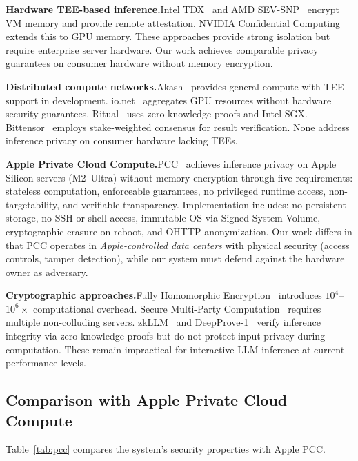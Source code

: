 \documentclass[10pt,twocolumn,letterpaper]{article}
\begin{document}
\textbf{Hardware TEE-based inference.}\quad Intel TDX~\cite{intel-tdx} and AMD SEV-SNP~\cite{amd-sev} encrypt VM memory and provide remote attestation. NVIDIA Confidential Computing~\cite{nvidia-cc} extends this to GPU memory. These approaches provide strong isolation but require enterprise server hardware. Our work achieves comparable privacy guarantees on consumer hardware without memory encryption.

\textbf{Distributed compute networks.}\quad Akash~\cite{akash} provides general compute with TEE support in development. io.net~\cite{ionet} aggregates GPU resources without hardware security guarantees. Ritual~\cite{ritual} uses zero-knowledge proofs and Intel SGX. Bittensor~\cite{bittensor} employs stake-weighted consensus for result verification. None address inference privacy on consumer hardware lacking TEEs.

\textbf{Apple Private Cloud Compute.}\quad PCC~\cite{apple-pcc} achieves inference privacy on Apple Silicon servers (M2~Ultra) without memory encryption through five requirements: stateless computation, enforceable guarantees, no privileged runtime access, non-targetability, and verifiable transparency. Implementation includes: no persistent storage, no SSH or shell access, immutable OS via Signed System Volume, cryptographic erasure on reboot, and OHTTP anonymization. Our work differs in that PCC operates in \emph{Apple-controlled data centers} with physical security (access controls, tamper detection), while our system must defend against the hardware owner as adversary.

\textbf{Cryptographic approaches.}\quad Fully Homomorphic Encryption~\cite{gentry-fhe} introduces $10^4$--$10^6\times$ computational overhead. Secure Multi-Party Computation~\cite{yao-mpc} requires multiple non-colluding servers. zkLLM~\cite{zkllm} and DeepProve-1~\cite{deepprove} verify inference integrity via zero-knowledge proofs but do not protect input privacy during computation. These remain impractical for interactive LLM inference at current performance levels.

\subsection{Comparison with Apple Private Cloud Compute}
\label{sec:pcc-comparison}

Table~\ref{tab:pcc} compares the system's security properties with Apple PCC.
\end{document}
